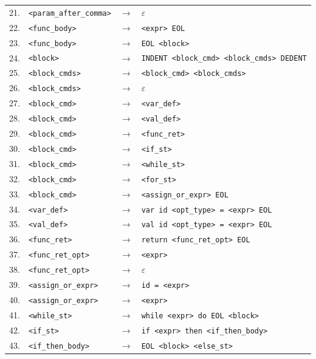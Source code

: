 {\begin{longtable}{rlcl}
21. & \texttt{<param\_after\_comma>} & $\rightarrow$ & $\varepsilon$ \\
22. & \texttt{<func\_body>} & $\rightarrow$ & \texttt{<expr> EOL} \\
23. & \texttt{<func\_body>} & $\rightarrow$ & \texttt{EOL <block>} \\
24. & \texttt{<block>} & $\rightarrow$ & \texttt{INDENT <block\_cmd> <block\_cmds> DEDENT} \\
25. & \texttt{<block\_cmds>} & $\rightarrow$ & \texttt{<block\_cmd> <block\_cmds>} \\
26. & \texttt{<block\_cmds>} & $\rightarrow$ & $\varepsilon$ \\
27. & \texttt{<block\_cmd>} & $\rightarrow$ & \texttt{<var\_def>} \\
28. & \texttt{<block\_cmd>} & $\rightarrow$ & \texttt{<val\_def>} \\
29. & \texttt{<block\_cmd>} & $\rightarrow$ & \texttt{<func\_ret>} \\
30. & \texttt{<block\_cmd>} & $\rightarrow$ & \texttt{<if\_st>} \\
31. & \texttt{<block\_cmd>} & $\rightarrow$ & \texttt{<while\_st>} \\
32. & \texttt{<block\_cmd>} & $\rightarrow$ & \texttt{<for\_st>} \\
33. & \texttt{<block\_cmd>} & $\rightarrow$ & \texttt{<assign\_or\_expr> EOL} \\
34. & \texttt{<var\_def>} & $\rightarrow$ & \texttt{var id <opt\_type> = <expr> EOL} \\
35. & \texttt{<val\_def>} & $\rightarrow$ & \texttt{val id <opt\_type> = <expr> EOL} \\
36. & \texttt{<func\_ret>} & $\rightarrow$ & \texttt{return <func\_ret\_opt> EOL} \\
37. & \texttt{<func\_ret\_opt>} & $\rightarrow$ & \texttt{<expr>} \\
38. & \texttt{<func\_ret\_opt>} & $\rightarrow$ & $\varepsilon$ \\
39. & \texttt{<assign\_or\_expr>} & $\rightarrow$ & \texttt{id = <expr>} \\
40. & \texttt{<assign\_or\_expr>} & $\rightarrow$ & \texttt{<expr>} \\
41. & \texttt{<while\_st>} & $\rightarrow$ & \texttt{while <expr> do EOL <block>} \\
42. & \texttt{<if\_st>} & $\rightarrow$ & \texttt{if <expr> then <if\_then\_body>} \\
43. & \texttt{<if\_then\_body>} & $\rightarrow$ & \texttt{EOL <block> <else\_st>} \\

\end{longtable}}
